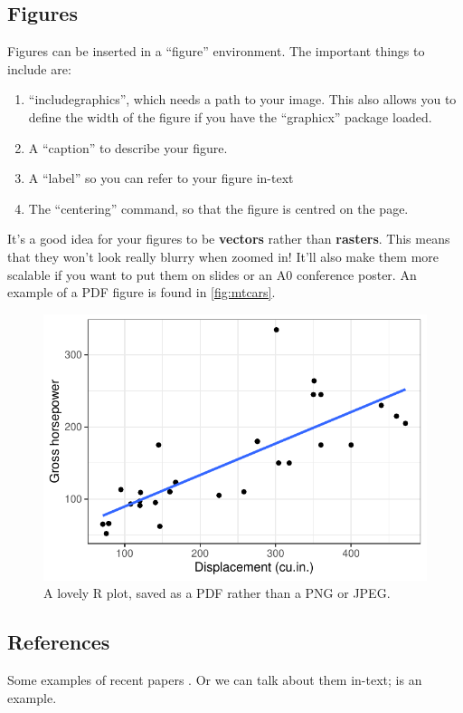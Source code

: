 \documentclass[a4paper]{article}
\begin{document}
\subsection{Figures}

Figures can be inserted in a ``figure'' environment. The important things to include are:

\begin{enumerate}
    \item ``includegraphics'', which needs a path to your image. This also allows you to define the width of the figure if you have the ``graphicx'' package loaded.
    \item A ``caption'' to describe your figure. 
    \item A ``label'' so you can refer to your figure in-text
    \item The ``centering'' command, so that the figure is centred on the page.
\end{enumerate}

It's a good idea for your figures to be \textbf{vectors} rather than \textbf{rasters}. This means that they won't look really blurry when zoomed in! It'll also make them more scalable if you want to put them on slides or an A0 conference poster. An example of a PDF figure is found in \autoref{fig:mtcars}.

\begin{figure}[bht]
    \centering
    \includegraphics[width=.8\linewidth]{plots/myplot.pdf}
    \caption{A lovely R plot, saved as a PDF rather than a PNG or JPEG.}
    \label{fig:mtcars}
\end{figure}

\subsection{References}

Some examples of recent papers \citep{Davison2020, Wagner2021ApplicationGases, Farren2020UnderestimatedVehicles, Farren2021CharacterisationCars}. Or we can talk about them in-text; \citet{Carslaw2011} is an example. 

\newpage

{\sloppy\printbibliography}
\end{document}
